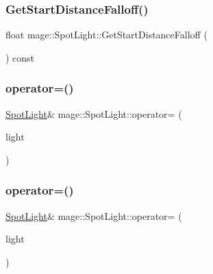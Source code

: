 \hypertarget{classmage_1_1_spot_light_a78ef6cc0ecd04cff8a4db9270e9ecb99}{}\label{classmage_1_1_spot_light_a78ef6cc0ecd04cff8a4db9270e9ecb99} 
\subsubsection{\texorpdfstring{Get\+Start\+Distance\+Falloff()}{GetStartDistanceFalloff()}}
{\footnotesize\ttfamily float mage\+::\+Spot\+Light\+::\+Get\+Start\+Distance\+Falloff (\begin{DoxyParamCaption}{ }\end{DoxyParamCaption}) const}

\hypertarget{classmage_1_1_spot_light_aeae25635a302f387fcbe66dd2f6d0ad7}{}\label{classmage_1_1_spot_light_aeae25635a302f387fcbe66dd2f6d0ad7} 
\subsubsection{\texorpdfstring{operator=()}{operator=()}\hspace{0.1cm}{\footnotesize\ttfamily [1/2]}}
{\footnotesize\ttfamily \hyperlink{classmage_1_1_spot_light}{Spot\+Light}\& mage\+::\+Spot\+Light\+::operator= (\begin{DoxyParamCaption}\item[{const \hyperlink{classmage_1_1_spot_light}{Spot\+Light} \&}]{light }\end{DoxyParamCaption})\hspace{0.3cm}{\ttfamily [delete]}}

\hypertarget{classmage_1_1_spot_light_aa33ea14e6a55db09f6d0785b67277ad0}{}\label{classmage_1_1_spot_light_aa33ea14e6a55db09f6d0785b67277ad0} 
\subsubsection{\texorpdfstring{operator=()}{operator=()}\hspace{0.1cm}{\footnotesize\ttfamily [2/2]}}
{\footnotesize\ttfamily \hyperlink{classmage_1_1_spot_light}{Spot\+Light}\& mage\+::\+Spot\+Light\+::operator= (\begin{DoxyParamCaption}\item[{\hyperlink{classmage_1_1_spot_light}{Spot\+Light} \&\&}]{light }\end{DoxyParamCaption})\hspace{0.3cm}{\ttfamily [delete]}}

